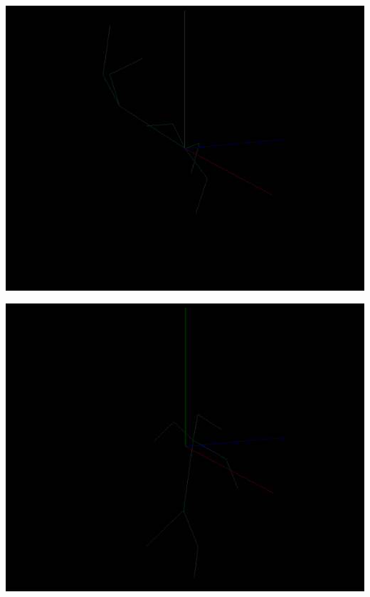 \documentclass[a4paper, 11pt]{article}
\begin{document}
            \begin{center}
                \includegraphics[width = \textwidth]{Animation2-3.PNG}
            \end{center}
            \begin{center}
                \includegraphics[width = \textwidth]{Animation2-4.PNG}
            \end{center}
\end{document}
